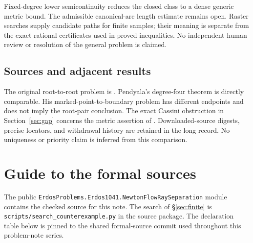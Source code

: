 \documentclass[11pt]{article}
\begin{document}
Fixed-degree lower semicontinuity reduces the closed class to a dense generic
metric bound.  The admissible canonical-arc length estimate remains open.
Raster searches supply candidate paths for finite samples; their meaning is
separate from the exact rational certificates used in proved inequalities.
No independent human review or resolution of the general problem is claimed.

\subsection*{Sources and adjacent results}\label{sec:1041-sources}

The original root-to-root problem is \cite[p.~139, Problem~5]{ehp1958}.
Pendyala's degree-four theorem \cite[Thm.~1]{june2026} is directly comparable.
His marked-point-to-boundary problem \cite{pendyala2026shortest} has different
endpoints and does not imply the root-pair conclusion.  The exact Cassini
obstruction in Section~\ref{sec:gap} concerns the metric assertion of
\cite[Prop.~12]{march2026}.  Downloaded-source digests, precise locators,
and withdrawal history are retained in the long record.  No uniqueness or
priority claim is inferred from this comparison.

\appendix
\section{Guide to the formal sources}\label{app:sources}

The public \texttt{ErdosProblems.Erdos1041.NewtonFlowRaySeparation} module
contains the checked source for this note.  The search of \S\ref{sec:finite} is
\texttt{scripts/search\_counterexample.py} in the source package.  The
declaration table below is pinned to the shared formal-source commit used
throughout this problem-note series.
\end{document}
